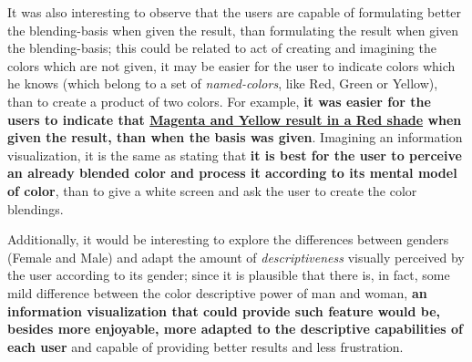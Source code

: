 %
It was also interesting to observe that the users are capable of formulating better the blending-basis when given the result, than formulating the result
when given the blending-basis; this could be related to act of creating and imagining the colors which are not given, it may be easier for the user to
indicate colors which he knows (which belong to a set of \emph{named-colors}, like Red, Green or Yellow), than to create a product of two colors. For
example, \textbf{it was easier for the users to indicate that \ul{Magenta and Yellow result in a Red shade} when given the result, than when the basis
was given}. Imagining an information visualization, it is the same as stating that \textbf{it is best for the user to perceive an already blended color
and process it according to its mental model of color}, than to give a white screen and ask the user to create the color blendings. \par
%
Additionally, it would be interesting to explore the differences between genders (Female and Male) and adapt the amount of \emph{descriptiveness} visually
perceived by the user according to its gender; since it is plausible that there is, in fact, some mild difference between the color descriptive power of
man and woman, \textbf{an information visualization that could provide such feature would be, besides more enjoyable, more adapted to the descriptive
capabilities of each user} and capable of providing better results and less frustration.
%
